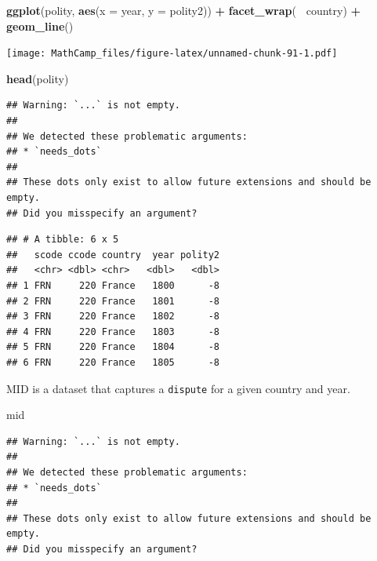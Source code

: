 \documentclass[
]{book}
\newenvironment{Shaded}{\begin{snugshade}}{\end{snugshade}}
\newcommand{\DataTypeTok}[1]{\textcolor[rgb]{0.13,0.29,0.53}{#1}}
\newcommand{\KeywordTok}[1]{\textcolor[rgb]{0.13,0.29,0.53}{\textbf{#1}}}
\newcommand{\NormalTok}[1]{#1}
\newcommand{\OperatorTok}[1]{\textcolor[rgb]{0.81,0.36,0.00}{\textbf{#1}}}
\newcommand{\StringTok}[1]{\textcolor[rgb]{0.31,0.60,0.02}{#1}}
\theoremstyle{definition}
\theoremstyle{definition}
\theoremstyle{definition}
\theoremstyle{definition}
\theoremstyle{remark}
\begin{document}
\begin{Shaded}
\begin{Highlighting}[]
\KeywordTok{ggplot}\NormalTok{(polity, }\KeywordTok{aes}\NormalTok{(}\DataTypeTok{x =}\NormalTok{ year, }\DataTypeTok{y =}\NormalTok{ polity2)) }\OperatorTok{+}
\StringTok{  }\KeywordTok{facet_wrap}\NormalTok{(}\OperatorTok{~}\StringTok{ }\NormalTok{country) }\OperatorTok{+}
\StringTok{  }\KeywordTok{geom_line}\NormalTok{()}
\end{Highlighting}
\end{Shaded}

\texttt{[image: MathCamp\_files/figure-latex/unnamed-chunk-91-1.pdf]}

\begin{Shaded}
\begin{Highlighting}[]
\KeywordTok{head}\NormalTok{(polity)}
\end{Highlighting}
\end{Shaded}

\begin{verbatim}
## Warning: `...` is not empty.
## 
## We detected these problematic arguments:
## * `needs_dots`
## 
## These dots only exist to allow future extensions and should be empty.
## Did you misspecify an argument?
\end{verbatim}

\begin{verbatim}
## # A tibble: 6 x 5
##   scode ccode country  year polity2
##   <chr> <dbl> <chr>   <dbl>   <dbl>
## 1 FRN     220 France   1800      -8
## 2 FRN     220 France   1801      -8
## 3 FRN     220 France   1802      -8
## 4 FRN     220 France   1803      -8
## 5 FRN     220 France   1804      -8
## 6 FRN     220 France   1805      -8
\end{verbatim}

MID is a dataset that captures a \texttt{dispute} for a given country and year.

\begin{Shaded}
\begin{Highlighting}[]
\NormalTok{mid}
\end{Highlighting}
\end{Shaded}

\begin{verbatim}
## Warning: `...` is not empty.
## 
## We detected these problematic arguments:
## * `needs_dots`
## 
## These dots only exist to allow future extensions and should be empty.
## Did you misspecify an argument?
\end{verbatim}
\end{document}
